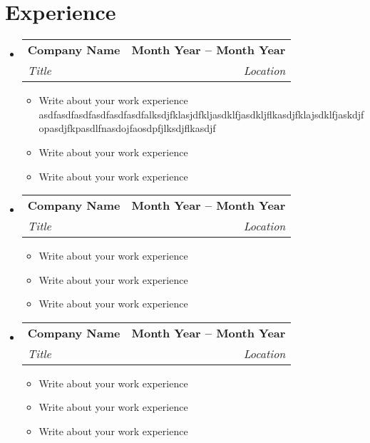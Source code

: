 \documentclass[letterpaper,11pt]{article}
\makeatletter
\newcommand{\resumeItem}[1]{
  \item\small{
    {#1 \vspace{-2pt}}
  }
}
\newcommand{\resumeSubheading}[4]{
  \vspace{-2pt}\item
    \begin{tabular*}{1.0\textwidth}[t]{l@{\extracolsep{\fill}}r}
      \textbf{#1} & \textbf{\small #2} \\
      \textit{\small#3} & \textit{\small #4} \\
    \end{tabular*}\vspace{-7pt}
}
\newcommand{\resumeSubHeadingListStart}{\begin{itemize}[leftmargin=0.0in, label={}]}
\newcommand{\resumeSubHeadingListEnd}{\end{itemize}}
\newcommand{\resumeItemListStart}{\begin{itemize}}
\newcommand{\resumeItemListEnd}{\end{itemize}\vspace{-5pt}}
\makeatother
\begin{document}
\section{Experience}
  \resumeSubHeadingListStart
    \resumeSubheading
      {Company Name }{Month Year -- Month Year}
      {Title}{Location}
      \resumeItemListStart
        \resumeItem {Write about your work experience asdfasdfasdfasdfasdfasdfalksdjfklasjdfkljasdklfjasdkljflkasdjfklajsdklfjaskdjfopasdjfkpasdlfnasdojfaosdpfjlksdjflkasdjf}
        \resumeItem {Write about your work experience}
        \resumeItem {Write about your work experience}
    \resumeItemListEnd
      
    \resumeSubheading
      {Company Name }{Month Year -- Month Year}
      {Title}{Location}
      \resumeItemListStart
        \resumeItem {Write about your work experience}
        \resumeItem {Write about your work experience}
        \resumeItem {Write about your work experience}
    \resumeItemListEnd
    
    \resumeSubheading
      {Company Name }{Month Year -- Month Year}
      {Title}{Location}
      \resumeItemListStart
        \resumeItem {Write about your work experience}
        \resumeItem {Write about your work experience}
        \resumeItem {Write about your work experience}
    \resumeItemListEnd
    
  \resumeSubHeadingListEnd
\vspace{-16pt}


\end{document}
